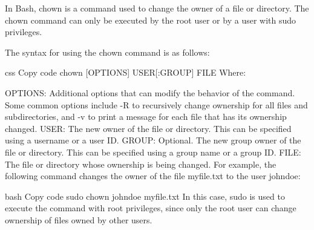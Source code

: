 In Bash, chown is a command used to change the owner of a file or directory. The chown command can only be executed by the root user or by a user with sudo privileges.

The syntax for using the chown command is as follows:

css
Copy code
chown [OPTIONS] USER[:GROUP] FILE
Where:

OPTIONS: Additional options that can modify the behavior of the command. Some common options include -R to recursively change ownership for all files and subdirectories, and -v to print a message for each file that has its ownership changed.
USER: The new owner of the file or directory. This can be specified using a username or a user ID.
GROUP: Optional. The new group owner of the file or directory. This can be specified using a group name or a group ID.
FILE: The file or directory whose ownership is being changed.
For example, the following command changes the owner of the file myfile.txt to the user johndoe:

bash
Copy code
sudo chown johndoe myfile.txt
In this case, sudo is used to execute the command with root privileges, since only the root user can change ownership of files owned by other users.
